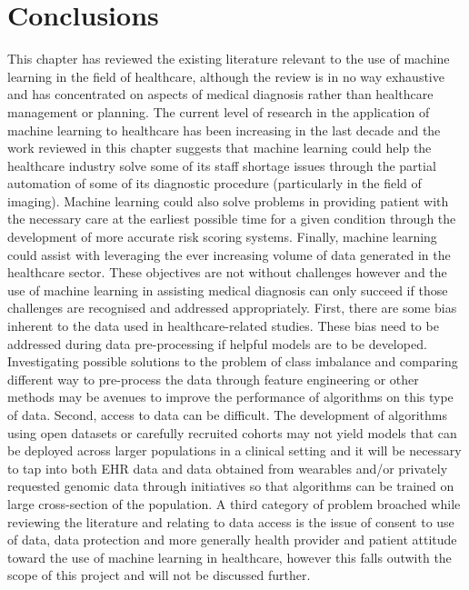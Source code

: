 \section{Conclusions}
This chapter has reviewed the existing literature relevant to the use of machine learning in the field of healthcare, although the review is in no way exhaustive and has concentrated on aspects of medical diagnosis rather than healthcare management or planning.\newline 
The current level of research in the application of machine learning to healthcare has been increasing in the last decade and the work reviewed in this chapter suggests that machine learning could help the healthcare industry solve some of its staff shortage issues through the partial automation of some of its diagnostic procedure (particularly in the field of imaging). Machine learning could also solve problems in providing patient with the necessary care at the earliest possible time for a given condition through the development of more accurate risk scoring systems. Finally, machine learning could assist with leveraging the ever increasing volume of data generated in the healthcare sector.\newline
These objectives are not without challenges however and the use of machine learning in assisting medical diagnosis can only succeed if those challenges are recognised and addressed appropriately.\newline
First, there are some bias inherent to the data used in healthcare-related studies. These bias need to be addressed during data pre-processing if helpful models are to be developed. Investigating possible solutions to the problem of class imbalance and comparing different way to pre-process the data through feature engineering or other methods may be avenues to improve the performance of algorithms on this type of data.\newline
Second, access to data can be difficult. The development of algorithms using open datasets or carefully recruited cohorts may not yield models that can be deployed across larger populations in a clinical setting and it will be necessary to tap into both EHR data and data obtained from wearables and/or privately requested genomic data through initiatives so that algorithms can be trained on large cross-section of the population.
\newline
A third category of problem broached while reviewing the literature and relating to data access is the issue of consent to use of data, data protection and more generally health provider and patient attitude toward the use of machine learning in healthcare, however this falls outwith the scope of this project and will not be discussed further.\newline




